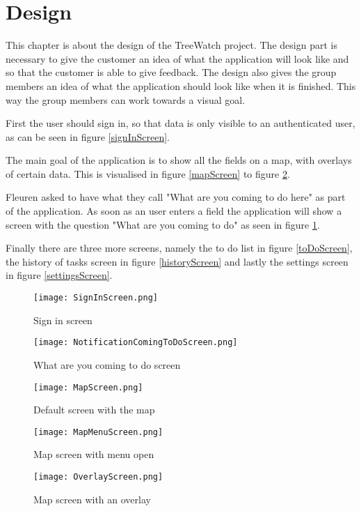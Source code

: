 \section{Design\label{sec:Design}}
This chapter is about the design of the TreeWatch project. The design part is necessary to give the customer an idea of what the application will look like and so that the customer is able to give feedback. The design also gives the group members an idea of what the application should look like when it is finished. This way the group members can work towards a visual goal.

First the user should sign in, so that data is only visible to an authenticated user, as can be seen in figure \ref{signInScreen}. 

The main goal of the application is to show all the fields on a map, with overlays of certain data. This is visualised in figure \ref{mapScreen} to figure \ref{overlayScreen}. 

Fleuren asked to have what they call "What are you coming to do here" as part of the application. As soon as an user enters a field the application will show a screen with the question "What are you coming to do" as seen in figure \ref{comingToDoScreen}. 

Finally there are three more screens, namely the to do list in figure \ref{toDoScreen}, the history of tasks screen in figure \ref{historyScreen} and lastly the settings screen in figure \ref{settingsScreen}.

\begin{figure}[ht]
	\centering
	\texttt{[image: SignInScreen.png]}
	\caption{Sign in screen}\label{signInScreen}
	\endminipage\hfill
	\centering
	\texttt{[image: NotificationComingToDoScreen.png]}
	\caption{What are you coming to do screen}\label{comingToDoScreen}
	\endminipage\hfill
\end{figure}

\begin{figure}[ht]
	\centering
	\texttt{[image: MapScreen.png]}
	\caption{Default screen with the map}\label{mapScreen}
	\endminipage\hfill
	\centering
	\texttt{[image: MapMenuScreen.png]}
	\caption{Map screen with menu open}\label{mapMenuScreen}
	\endminipage\hfill
	\centering
	\texttt{[image: OverlayScreen.png]}
	\caption{Map screen with an overlay}\label{overlayScreen}
	\endminipage\hfill
\end{figure}

